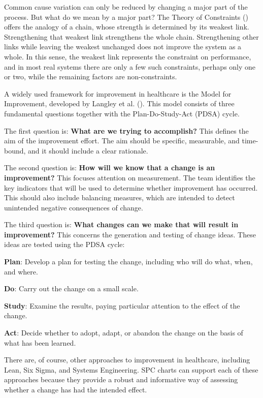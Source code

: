 \documentclass[
]{book}
\begin{document}
Common cause variation can only be reduced by changing a major part of
the process. But what do we mean by a major part? The Theory of
Constraints () offers
the analogy of a chain, whose strength is determined by its weakest
link. Strengthening that weakest link strengthens the whole chain.
Strengthening other links while leaving the weakest unchanged does not
improve the system as a whole. In this sense, the weakest link
represents the constraint on performance, and in most real systems there
are only a few such constraints, perhaps only one or two, while the
remaining factors are non-constraints.

A widely used framework for improvement in healthcare is the Model for
Improvement, developed by Langley et al.
(). This model consists of three
fundamental questions together with the Plan-Do-Study-Act (PDSA) cycle.

The first question is: \textbf{What are we trying to accomplish?} This
defines the aim of the improvement effort. The aim should be specific,
measurable, and time-bound, and it should include a clear rationale.

The second question is: \textbf{How will we know that a change is an
improvement?} This focuses attention on measurement. The team identifies
the key indicators that will be used to determine whether improvement
has occurred. This should also include balancing measures, which are
intended to detect unintended negative consequences of change.

The third question is: \textbf{What changes can we make that will result
in improvement?} This concerns the generation and testing of change
ideas. These ideas are tested using the PDSA cycle:

\textbf{Plan}: Develop a plan for testing the change, including who will
do what, when, and where.

\textbf{Do}: Carry out the change on a small scale.

\textbf{Study}: Examine the results, paying particular attention to the
effect of the change.

\textbf{Act}: Decide whether to adopt, adapt, or abandon the change on
the basis of what has been learned.

There are, of course, other approaches to improvement in healthcare,
including Lean, Six Sigma, and Systems Engineering. SPC charts can
support each of these approaches because they provide a robust and
informative way of assessing whether a change has had the intended
effect.
\end{document}
